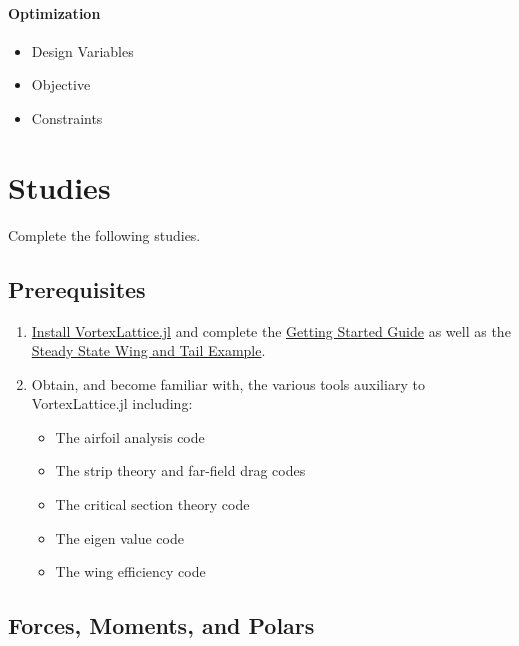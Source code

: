 \documentclass[11pt,twocolumn]{article}
\begin{document}
\paragraph{Optimization}
\begin{itemize}
	\item Design Variables
	\item Objective
	\item Constraints
\end{itemize}

\newpage

\section{Studies}
\label{sec:studies}

Complete the following studies.

\subsection{Prerequisites}
\label{ssec:prereqs}

\begin{enumerate}[label=\roman*.]
	\item \href{https://flow.byu.edu/VortexLattice.jl/stable/#Installation}{Install VortexLattice.jl} and complete the \href{https://flow.byu.edu/VortexLattice.jl/stable/guide/}{Getting Started Guide} as well as the \href{https://flow.byu.edu/VortexLattice.jl/stable/examples/#Steady-State-Analysis-of-a-Wing-and-Tail}{Steady State Wing and Tail Example}.
	\item Obtain, and become familiar with, the various tools auxiliary to VortexLattice.jl including:
	\begin{itemize}
		\item The airfoil analysis code
		\item The strip theory and far-field drag codes
		\item The critical section theory code
		\item The eigen value code
		\item The wing efficiency code
	\end{itemize}
\end{enumerate}

\subsection{Forces, Moments, and Polars}
\end{document}
